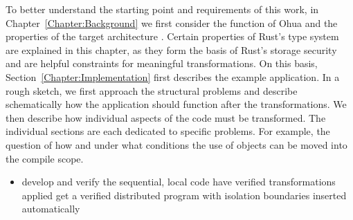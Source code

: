 To better understand the starting point and requirements of this work, in Chapter~\ref{Chapter:Background} we first consider the function of Ohua and the properties of the target architecture \md. Certain properties of Rust's type system are explained in this chapter, as they form the basis of Rust's storage security and are helpful constraints for meaningful transformations. On this basis, Section~\ref{Chapter:Implementation} first describes the example application. In a rough sketch, we first approach the structural problems and describe schematically how the application should function after the transformations. We then describe how individual aspects of the code must be transformed. The individual sections are each dedicated to specific problems. For example, the question of how and under what conditions the use of objects can be moved into the compile scope.


\begin{itemize}
    \item develop and verify the sequential, local code \means have verified transformations applied \means get a verified distributed program with isolation boundaries inserted automatically
\end{itemize}

